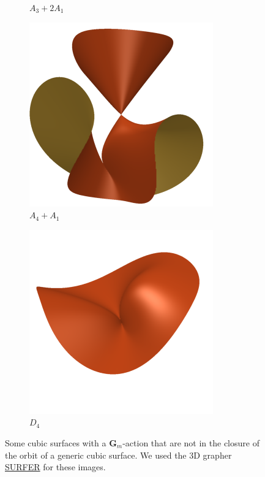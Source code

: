 \documentclass[12pt,reqno]{amsart}
\numberwithin{equation}{section}
\newcommand{\G}{\mathbf G}
\begin{document}
\begin{figure}
\begin{subfigure}{.24\textwidth}
    \caption{$A_3+2A_1$}
  \end{subfigure}
  \begin{subfigure}{.24\textwidth}
    \centering
    \includegraphics[width=\textwidth]{cubicA4_A1}
    \caption{$A_4+A_1$}
  \end{subfigure}
  \begin{subfigure}{.24\textwidth}
    \centering
    \includegraphics[width=\textwidth]{cubicD4}
    \caption{$D_4$}
  \end{subfigure}
  \caption{Some cubic surfaces with a $\G_m$-action that are not in
    the closure of the orbit of a generic cubic surface. We used the
    3D grapher
    \href{https://singsurf.org/parade/Cubics.php}{SURFER} for these
    images.}
  \label{fig:surfaces}
\end{figure}
\end{document}
